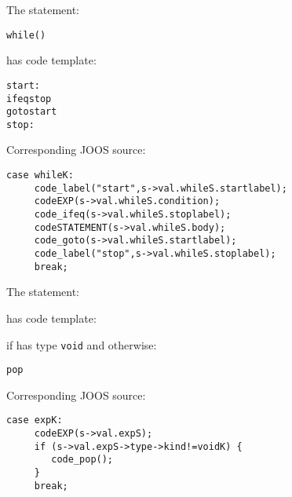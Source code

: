\begin{slide*}
The statement:
 
\begin{scriptsize}
\begin{alltt}
     while () 
\end{alltt}
\end{scriptsize}
 
has code template:
 
\begin{scriptsize}
\begin{alltt}
    start:
    ifeq stop
    goto start
    stop:
\end{alltt}
\end{scriptsize}
 
Corresponding JOOS source:
 
\begin{scriptsize}
\begin{verbatim}
case whileK:
     code_label("start",s->val.whileS.startlabel);
     codeEXP(s->val.whileS.condition);
     code_ifeq(s->val.whileS.stoplabel);
     codeSTATEMENT(s->val.whileS.body);
     code_goto(s->val.whileS.startlabel);
     code_label("stop",s->val.whileS.stoplabel);
     break;
\end{verbatim}
\end{scriptsize}
\vfil
\end{slide*}

\begin{slide*}
The statement:
 
\begin{scriptsize}
\begin{alltt}
\end{alltt}
\end{scriptsize}
 
has code template:
 
\begin{scriptsize}
\begin{alltt}
\end{alltt}
\end{scriptsize}

if  has type {\tt void} and otherwise:

\begin{scriptsize}
\begin{alltt}
     pop
\end{alltt}
\end{scriptsize}
 
Corresponding JOOS source:
 
\begin{scriptsize}
\begin{verbatim}
case expK:
     codeEXP(s->val.expS);
     if (s->val.expS->type->kind!=voidK) {
        code_pop();
     }
     break;
\end{verbatim}
\end{scriptsize}
\vfil
\end{slide*}


